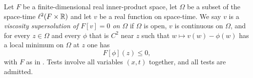 \begin{definition}
Let $F$ be a finite-dimensional real inner-product space, let $\Omega$ be a
subset of the space-time $\ell^2(F\times\mathbb{R})$ and let $v$ be a real function on
space-time. We say $v$ is a \emph{viscosity supersolution of $F[v]=0$ on
$\Omega$} if $\Omega$ is open, $v$ is continuous on $\Omega$, and for every
$z\in\Omega$ and every $\phi$ that is $C^2$ near $z$ such that $w\mapsto
v(w)-\phi(w)$ has a local minimum on $\Omega$ at $z$ one has
\[
  F[\phi](z)\le0,
\]
with $F$ as in . Tests involve all variables $(x,t)$ together,
and all tests are admitted.
\end{definition}
